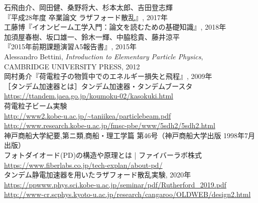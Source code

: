 \documentclass[a4paper,11pt,dvipdfmx]{jsarticle}
\begin{document}
\newpage
{}
\begin{thebibliography}{99}

   石飛由介、岡田健、桑野将大、杉本太郎、吉田登志輝 \\
『平成28年度 卒業論文 ラザフォード散乱』, 2017年
  \\
   工藤博『イオンビーム工学入門：論文を読むための基礎知識』, 2018年
  \\
   加須屋春樹、坂口雄一、鈴木一輝、中脇稔貴、藤井涼平 \\
『2015年前期課題演習A5報告書』, 2015年
  \\
   Alessandro Bettini, \textit{Introduction to Elementary Particle Physics}, \\ 
CAMBRIDGE UNIVERSITY PRESS, 2012
  \\
   岡村勇介『荷電粒子の物質中でのエネルギー損失と飛程』, 2009年
  \\ %
  
    ［タンデム加速器とは］タンデム加速器・タンデムブースタ\\
  \url{https://ttandem.jaea.go.jp/koumoku-02/kasokuki.html}\\
  
  荷電粒子ビーム実験\\
  \url{http://www2.kobe-u.ac.jp/~taniikea/particlebeam.pdf}\\
  
  \url{http://www.research.kobe-u.ac.jp/fmsc-pbe/www/5sdh2/5sdh2.html}\\
  
  神戸商船大学紀要,第ニ類,商船・理工学篇 第46号（神戸商船大学出版 1998年7月出版）\\
  
  フォトダイオード(PD)の構造や原理とは | ファイバーラボ株式\\
  \url{https://www.fiberlabs.co.jp/tech-explan/about-pd/}\\

   タンデム静電加速器を用いたラザフォード散乱実験, 2020年\\
  \url{https://ppwww.phys.sci.kobe-u.ac.jp/seminar/pdf/Rutherford_2019.pdf}\\
  
  \url{http://www-cr.scphys.kyoto-u.ac.jp/research/cangaroo/OLDWEB/design2.html}\\
  

\end{thebibliography}
\end{document}
